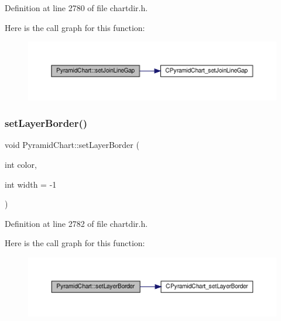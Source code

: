 Definition at line 2780 of file chartdir.\+h.

Here is the call graph for this function\+:
\nopagebreak
\begin{figure}[H]
\begin{center}
\leavevmode
\includegraphics[width=350pt]{class_pyramid_chart_a62eee50bacc01aad83f2eee46817d2e4_cgraph}
\end{center}
\end{figure}
\mbox{\label{class_pyramid_chart_a60f3d9e9230b779498d40c9b1a287fe5}} 
\subsubsection{\texorpdfstring{set\+Layer\+Border()}{setLayerBorder()}}
{\footnotesize\ttfamily void Pyramid\+Chart\+::set\+Layer\+Border (\begin{DoxyParamCaption}\item[{int}]{color,  }\item[{int}]{width = {\ttfamily -\/1} }\end{DoxyParamCaption})\hspace{0.3cm}{\ttfamily [inline]}}



Definition at line 2782 of file chartdir.\+h.

Here is the call graph for this function\+:
\nopagebreak
\begin{figure}[H]
\begin{center}
\leavevmode
\includegraphics[width=350pt]{class_pyramid_chart_a60f3d9e9230b779498d40c9b1a287fe5_cgraph}
\end{center}
\end{figure}
\mbox{\label{class_pyramid_chart_af3665fa72ba30465f59d2b8dc54eeaaf}} 
